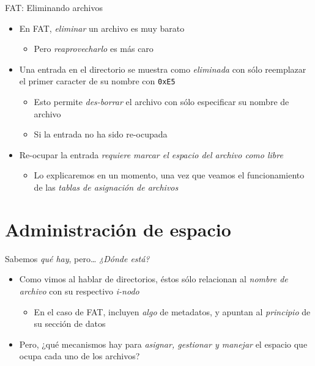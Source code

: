 \documentclass[presentation]{beamer}
\begin{document}
\begin{frame}[label={sec:org60e82b1},fragile]{FAT: Eliminando archivos}
 \begin{itemize}
\item En FAT, \emph{eliminar} un archivo es muy barato
\begin{itemize}
\item Pero \emph{reaprovecharlo} es más caro
\end{itemize}
\item Una entrada en el directorio se muestra como \emph{eliminada} con sólo
reemplazar el primer caracter de su nombre con \texttt{0xE5}
\begin{itemize}
\item Esto permite \emph{des-borrar} el archivo con sólo especificar su
nombre de archivo
\item Si la entrada no ha sido re-ocupada
\end{itemize}
\item Re-ocupar la entrada \emph{requiere marcar el espacio del archivo como
libre}
\begin{itemize}
\item Lo explicaremos en un momento, una vez que veamos el
funcionamiento de las \emph{tablas de asignación de archivos}
\end{itemize}
\end{itemize}
\end{frame}


\section{Administración de espacio}
\label{sec:orga6aee2d}

\begin{frame}[label={sec:orga8c61e7}]{Sabemos \emph{qué hay}, pero\ldots{} \emph{¿Dónde está?}}
\begin{itemize}
\item Como vimos al hablar de directorios, éstos sólo relacionan al
\emph{nombre de archivo} con su respectivo \emph{i-nodo}
\begin{itemize}
\item En el caso de FAT, incluyen \emph{algo} de metadatos, y apuntan al
\emph{principio} de su sección de datos
\end{itemize}
\item Pero, ¿qué mecanismos hay para \emph{asignar, gestionar y manejar} el
espacio que ocupa cada uno de los archivos?
\end{itemize}
\end{frame}
\end{document}
